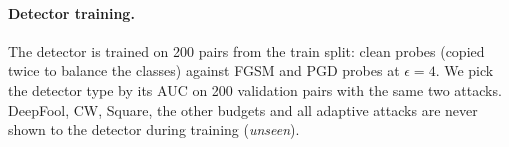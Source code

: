 \paragraph{Detector training.} The detector is trained on 200 pairs from the train split: clean probes (copied twice to balance the classes) against FGSM and PGD probes at $\epsilon{=}4$. We pick the detector type by its AUC on 200 validation pairs with the same two attacks. DeepFool, CW, Square, the other budgets and all adaptive attacks are never shown to the detector during training (\emph{unseen}).
